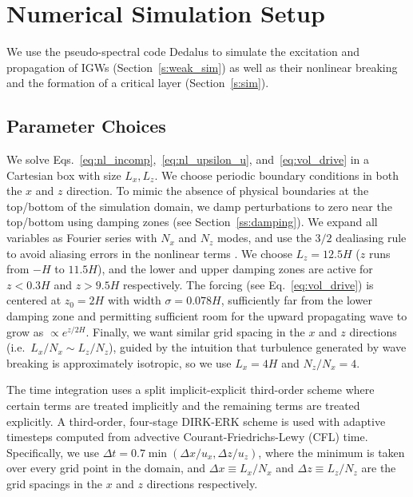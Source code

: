 \documentclass[
        fleqn,
        usenatbib,
    ]{mnras}
\begin{document}
\section{Numerical Simulation Setup}\label{s:numerics}

We use the pseudo-spectral code Dedalus \citep{dedalus,dedalus2} to simulate
the excitation and propagation of IGWs (Section~\ref{s:weak_sim}) as well as
their nonlinear breaking and the formation of a critical layer
(Section~\ref{s:sim}).

\subsection{Parameter Choices}\label{ss:params}

We solve Eqs.~\eqref{eq:nl_incomp},~\eqref{eq:nl_upsilon_u},
and~\eqref{eq:vol_drive} in a Cartesian box with size $L_x, L_z$. We choose
periodic boundary conditions in both the $x$ and $z$ direction. To mimic the
absence of physical boundaries at the top/bottom of the simulation domain, we
damp perturbations to zero near the top/bottom using damping zones (see
Section~\ref{ss:damping}). We expand all variables as Fourier series with $N_x$
and $N_z$ modes, and use the $3/2$ dealiasing rule to avoid aliasing errors in
the nonlinear terms \citep{boyd}. We choose $L_z = 12.5H$ ($z$ runs from $-H$ to
$11.5H$), and the lower and upper damping zones are active for $z < 0.3H$ and $z
> 9.5H$ respectively. The forcing (see Eq.~\eqref{eq:vol_drive}) is centered at
$z_0 = 2H$ with width $\sigma = 0.078H$, sufficiently far from the lower damping
zone and permitting sufficient room for the upward propagating wave to grow as
$\propto e^{z/2H}$. Finally, we want similar grid spacing in the $x$ and $z$
directions (i.e.\ $L_x / N_x \sim L_z /N_z$), guided by the intuition that
turbulence generated by wave breaking is approximately isotropic, so we use $L_x
= 4H$ and $N_z / N_x = 4$.

The time integration uses a split implicit-explicit third-order scheme where
certain terms are treated implicitly and the remaining terms are treated
explicitly. A third-order, four-stage DIRK-ERK scheme \citep{ascher} is used
with adaptive timesteps computed from advective Courant-Friedrichs-Lewy (CFL)
time. Specifically, we use $\Delta t = 0.7 \min(\Delta x / u_x,\Delta z /
u_{z})$, where the minimum is taken over every grid point in the domain, and
$\Delta x \equiv L_x / N_x$ and $\Delta z \equiv L_z / N_z$ are the grid
spacings in the $x$ and $z$ directions respectively.
\end{document}
